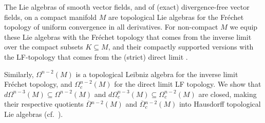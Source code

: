 \documentclass{article}
\newcommand{\oline}{\overline}
\theoremstyle{definition}
\begin{document}
The Lie algebras of smooth vector fields, and of (exact) divergence-free vector fields, on a compact manifold $M$
are topological Lie algebras for the Fr\'echet topology of uniform convergence in all derivatives.
For non-compact $M$ we equip these Lie algebras with the Fr\'echet topology that comes from the inverse limit over the compact subsets $K\subseteq M$, 
and their compactly supported versions with the LF-topology that comes from the (strict) direct limit \cite[Section I.13]{Treves1967}. 

Similarly, $\Omega^{n-2}(M)$ is a topological Leibniz algebra for the inverse limit Fr\'echet topology, and $\Omega_{c}^{n-2}(M)$ for the 
direct limit LF topology.
We show that $d\Omega^{n-3}(M)\subseteq \Omega^{n-2}(M)$ and 
$d\Omega^{n-3}_{c}(M)\subseteq \Omega_{c}^{n-2}(M)$ are closed, 
making their respective quotients $\oline{\Omega}{}^{n-2}(M)$ and $\oline{\Omega}{}_{c}^{n-2}(M)$ into Hausdorff topological Lie algebras
(cf.~\cite[Theorem 1.41]{rudinFunctionalAnalysis1991}). 
\end{document}
